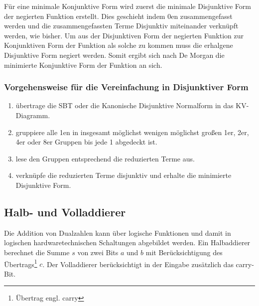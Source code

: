 
Für eine minimale Konjunktive Form wird zuerst die minimale Disjunktive Form der negierten Funktion erstellt. Dies geschieht indem 0en zusammengefasst werden und die zusammengefassten Terme Disjunktiv miteinander verknüpft werden, wie bisher. Um aus der Disjunktiven Form der negierten Funktion zur Konjunktiven Form der Funktion als solche zu kommen muss die erhalgene Disjunktive Form negiert werden. Somit ergibt sich nach De Morgan die minimierte Konjunktive Form der Funktion an sich.

\subsubsection*{Vorgehensweise für die Vereinfachung in Disjunktiver Form}
\begin{enumerate}
  \item übertrage die SBT oder die Kanonische Disjunktive Normalform in das KV-Diagramm.
  \item gruppiere alle 1en in insgesamt möglichst wenigen möglichst großen 1er, 2er, 4er oder 8er Gruppen  bis jede 1 abgedeckt ist.
  \item lese den Gruppen entsprechend die reduzierten Terme aus.
  \item verknüpfe die reduzierten Terme disjunktiv und erhalte die minimierte Disjunktive Form.
\end{enumerate}

\subsection{Halb- und Volladdierer}
Die Addition von Dualzahlen kann über logische Funktionen und damit in logischen hardwaretechnischen Schaltungen abgebildet werden. Ein Halbaddierer berechnet die Summe $s$ von zwei Bits $a$ und $b$ mit Berücksichtigung des Übertrags\footnote{Übertrag engl. carry} $c$. Der Volladdierer berücksichtigt in der Eingabe zusätzlich das carry-Bit.


